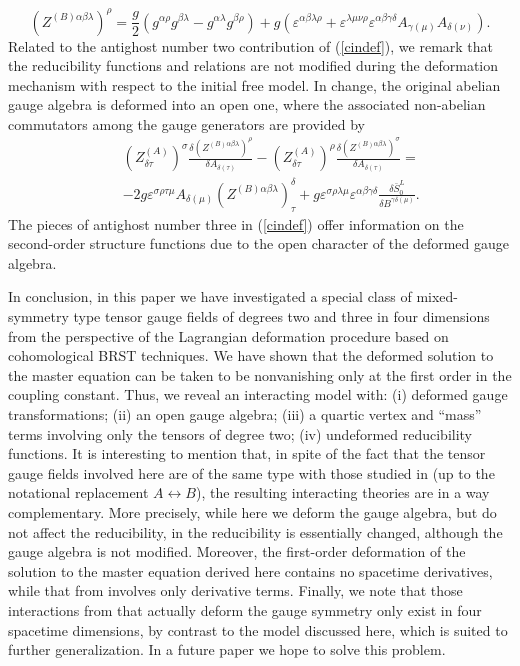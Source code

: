 \documentclass[a4paper,12pt]{article}
\begin{document}
\begin{equation}
\left( Z^{(B)\alpha \beta \lambda }\right) ^{\rho }=\frac{g}{2}\left(
g^{\alpha \rho }g^{\beta \lambda }-g^{\alpha \lambda }g^{\beta \rho }\right)
+g\left( \varepsilon ^{\alpha \beta \lambda \rho }+\varepsilon ^{\lambda \mu
\nu \rho }\varepsilon ^{\alpha \beta \gamma \delta }A_{\gamma (\mu
)}A_{\delta (\nu )}\right) .  \label{cin33}
\end{equation}
Related to the antighost number two contribution of (\ref{cindef}), we
remark that the reducibility functions and relations are not modified during
the deformation mechanism with respect to the initial free model. In change,
the original abelian gauge algebra is deformed into an open one, where the
associated non-abelian commutators among the gauge generators are provided
by
\begin{eqnarray}
&&\left( Z_{\delta \tau }^{(A)}\right) ^{\sigma }\frac{\delta
\left(
Z^{(B)\alpha \beta \lambda }\right) ^{\rho }}{\delta A_{\delta (\tau )}}%
-\left( Z_{\delta \tau }^{(A)}\right) ^{\rho }\frac{\delta \left(
Z^{(B)\alpha \beta \lambda }\right) ^{\sigma }}{\delta A_{\delta
(\tau )}}= \nonumber \\
&&-2g\varepsilon ^{\sigma \rho \tau \mu }A_{\delta (\mu )}\left(
Z^{(B)\alpha \beta \lambda }\right) _{\tau }^{\delta
}+g\varepsilon ^{\sigma \rho \lambda \mu }\varepsilon ^{\alpha
\beta \gamma \delta } \frac{\delta \bar{S}_{0}^{L}}{\delta
B^{\gamma \delta (\mu )}}.  \label{cin36}
\end{eqnarray}
The pieces of antighost number three in (\ref{cindef}) offer information on
the second-order structure functions due to the open character of the
deformed gauge algebra.

In conclusion, in this paper we have investigated a special class
of mixed-symmetry type tensor gauge fields of degrees two and
three in four dimensions from the perspective of the Lagrangian
deformation procedure based on cohomological BRST techniques. We
have shown that the deformed solution to the master equation can
be taken to be nonvanishing only at the first order in the
coupling constant. Thus, we reveal an interacting model with: (i)
deformed gauge transformations; (ii) an open gauge algebra; (iii)
a quartic vertex and ``mass'' terms involving only the tensors of
degree two; (iv) undeformed reducibility functions. It is
interesting to mention that, in spite of the fact that the tensor
gauge fields involved here are of the same type with those studied
in \cite{EPJC} (up to the notational replacement
$A\longleftrightarrow B$), the resulting interacting theories are
in a way complementary. More precisely, while here we deform the
gauge algebra, but do not affect the reducibility, in \cite{EPJC}
the reducibility is essentially changed, although the gauge
algebra is not modified. Moreover, the first-order deformation of
the solution to the master equation derived here contains no
spacetime derivatives, while that from \cite{EPJC} involves only
derivative terms. Finally, we note that those interactions from
\cite{EPJC} that actually deform the gauge symmetry only exist in
four spacetime dimensions, by contrast to the model discussed
here, which is suited to further generalization. In a future paper
we hope to solve this problem.
\end{document}

